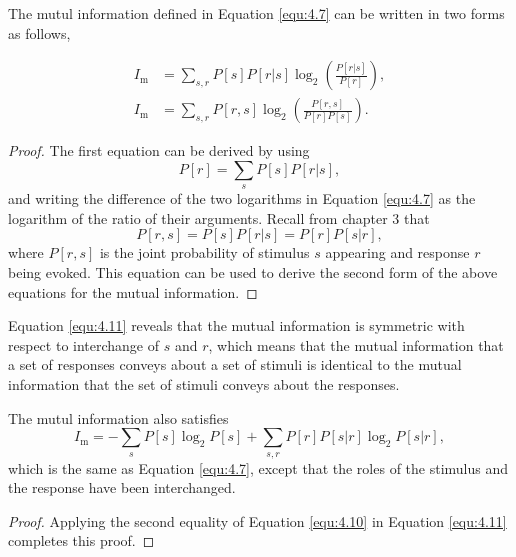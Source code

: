 \begin{prop}
  The mutul information defined in Equation \ref{equ:4.7} can be written in two forms as follows,
  
  \begin{align}
    \label{equ:4.9}   I_{\text{m}}&=\sum\limits_{s,r}{P[s]P[r|s]\log_2\left(
                                   \frac{P[r|s]}{P[r]} \right)},\\
    \label{equ:4.11}  I_{\text{m}}&=\sum\limits_{s,r}{P[r,s]\log_2\left( \frac{P[r,s]}{P[r]P[s]} \right)}.
  \end{align}
  \begin{proof}
    The first equation can be derived by using 
    \begin{equation}
      \label{equ:4.8}
      P[r]=\sum\limits_s{P[s]P[r|s]},
    \end{equation}
    and writing the difference of the two logarithms in Equation \ref{equ:4.7} as the logarithm of the ratio of their arguments.
    Recall from chapter 3 that
    \begin{equation}
      \label{equ:4.10}
      P[r,s]=P[s]P[r|s]=P[r]P[s|r],
    \end{equation}
    where $P[r,s]$ is the joint probability of stimulus $s$ appearing and response $r$ being evoked. This equation can be used to derive the second form of the above equations for the mutual information.
  \end{proof}
\end{prop}

\begin{rem}
  Equation \ref{equ:4.11} reveals that the mutual information is symmetric with respect to interchange of $s$ and $r$, which means that the mutual information that a set of responses conveys about a set of stimuli is identical to the mutual information that the set of stimuli conveys about the responses.
\end{rem}


\begin{thm}
  The mutul information also satisfies
  \begin{equation}
    \label{equ:4.12}
    I_{\text{m}}=-\sum\limits_{s}{P[s]\log_2P[s]}+\sum\limits_{s,r}{P[r]P[s|r]\log_2P[s|r]},
  \end{equation}
  which is the same as Equation \ref{equ:4.7}, except that the roles of the stimulus and the response have been interchanged.
  \begin{proof}
    Applying the second equality of Equation \ref{equ:4.10} in Equation \ref{equ:4.11} completes this proof.
  \end{proof}
\end{thm}

